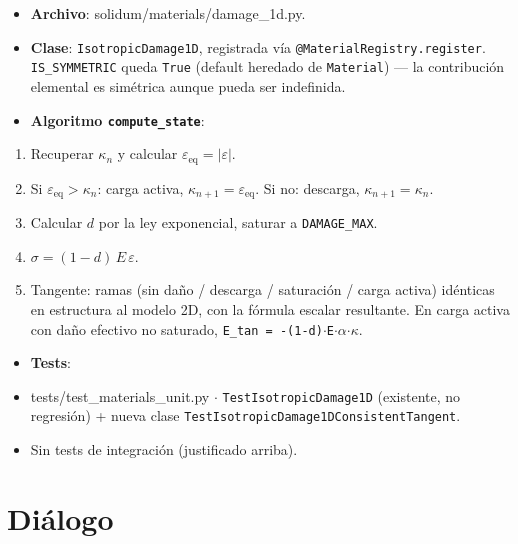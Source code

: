 \documentclass[11pt,letterpaper,oneside]{report}
\begin{document}
\begin{itemize}
  \item \textbf{Archivo}: solidum/materials/damage\_1d.py.
  \item \textbf{Clase}: \texttt{IsotropicDamage1D}, registrada vía \texttt{@MaterialRegistry.register}. \texttt{IS\_SYMMETRIC} queda \texttt{True} (default heredado de \texttt{Material}) --- la contribución elemental es simétrica aunque pueda ser indefinida.
  \item \textbf{Algoritmo \texttt{compute\_state}}:
\end{itemize}
\begin{enumerate}
  \item Recuperar $\kappa_n$ y calcular $\varepsilon_\text{eq} = |\varepsilon|$.
  \item Si $\varepsilon_\text{eq} > \kappa_n$: carga activa, $\kappa_{n+1} = \varepsilon_\text{eq}$. Si no: descarga, $\kappa_{n+1} = \kappa_n$.
  \item Calcular $d$ por la ley exponencial, saturar a \texttt{DAMAGE\_MAX}.
  \item $\sigma = (1 - d)\,E\,\varepsilon$.
  \item Tangente: ramas (sin daño / descarga / saturación / carga activa) idénticas en estructura al modelo 2D, con la fórmula escalar resultante. En carga activa con daño efectivo no saturado, \texttt{E\_tan = -(1-d)\ensuremath{\cdot}E\ensuremath{\cdot}\ensuremath{\alpha}\ensuremath{\cdot}\ensuremath{\kappa}}.
\end{enumerate}
\begin{itemize}
  \item \textbf{Tests}:
  \item tests/test\_materials\_unit.py \ensuremath{\cdot} \texttt{TestIsotropicDamage1D} (existente, no regresión) + nueva clase \texttt{TestIsotropicDamage1DConsistentTangent}.
  \item Sin tests de integración (justificado arriba).
\end{itemize}


\section{Diálogo}
\end{document}
